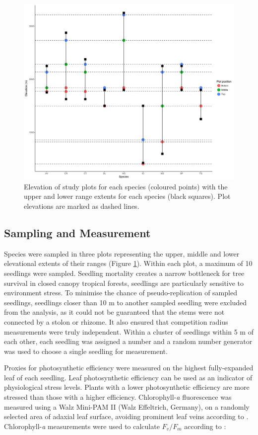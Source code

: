 \documentclass[a4paper,11pt]{article}
\begin{document}
\begin{figure}[H]
\includegraphics[width=\textwidth]{ranges_ggplot}
\centering
\caption{Elevation of study plots for each species (coloured points) with the upper and lower range extents for each species (black squares). Plot elevations are marked as dashed lines.}
\label{fig:ranges_ggplot}
\end{figure}

\subsection{Sampling and Measurement}
Species were sampled in three plots representing the upper, middle and lower elevational extents of their ranges (Figure \ref{fig:ranges_ggplot}). Within each plot, a maximum of 10 seedlings were sampled. Seedling mortality creates a narrow bottleneck for tree survival in closed canopy tropical forests, seedlings are particularly sensitive to environment stress. To minimise the chance of pseudo-replication of sampled seedlings, seedlings closer than 10 m to another sampled seedling were excluded from the analysis, as it could not be guaranteed that the stems were not connected by a stolon or rhizome. It also ensured that competition radius measurements were truly independent. Within a cluster of seedlings within 5 m of each other, each seedling was assigned a number and a random number generator was used to choose a single seedling for measurement.

Proxies for photosynthetic efficiency were measured on the highest fully-expanded leaf of each seedling. Leaf photosynthetic efficiency can be used as an indicator of physiological stress levels. Plants with a lower photosynthetic efficiency are more stressed than those with a higher efficiency. Chlorophyll-\textit{a} fluorescence was measured using a Walz Mini-PAM II (Walz Effeltrich, Germany), on a randomly selected area of adaxial leaf surface, avoiding prominent leaf veins according to \citep{}. Chlorophyll-\textit{a} measurements were used to calculate $F_v/F_m$ according to \citet{Genty1989}:
\end{document}
